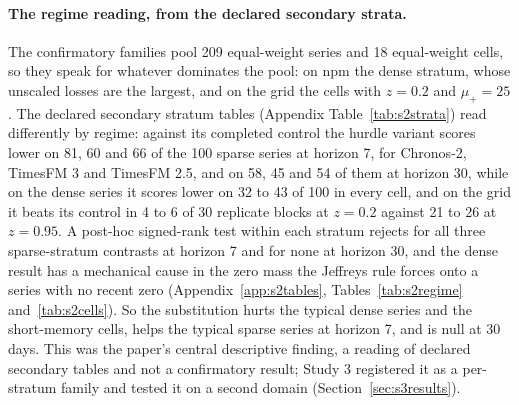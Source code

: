 \paragraph{The regime reading, from the declared secondary strata.} The confirmatory families pool 209
equal-weight series and 18 equal-weight cells, so they speak for whatever dominates the pool: on npm the
dense stratum, whose unscaled losses are the largest, and on the grid the cells with $z = 0.2$ and
$\mu_{+} = 25$. The declared secondary stratum tables (Appendix Table~\ref{tab:s2strata}) read
differently by regime: against its completed control the hurdle variant scores lower on 81, 60 and 66 of
the 100 sparse series at horizon 7, for Chronos-2, TimesFM 3 and TimesFM 2.5, and on 58, 45 and 54 of
them at horizon 30, while on the dense series it scores lower on 32 to 43 of 100 in every cell, and on
the grid it beats its control in 4 to 6 of 30 replicate blocks at $z = 0.2$ against 21 to 26 at
$z = 0.95$. A post-hoc signed-rank test within each stratum rejects for all three sparse-stratum
contrasts at horizon 7 and for none at horizon 30, and the dense result has a mechanical cause in the
zero mass the Jeffreys rule forces onto a series with no recent zero (Appendix~\ref{app:s2tables},
Tables~\ref{tab:s2regime} and~\ref{tab:s2cells}). So the substitution hurts the typical dense series
and the short-memory cells, helps the typical sparse series at horizon 7, and is null at 30 days. This
was the paper's central descriptive finding, a reading of declared secondary tables and not a
confirmatory result; Study 3 registered it as a per-stratum family and tested it on a second domain
(Section~\ref{sec:s3results}).

